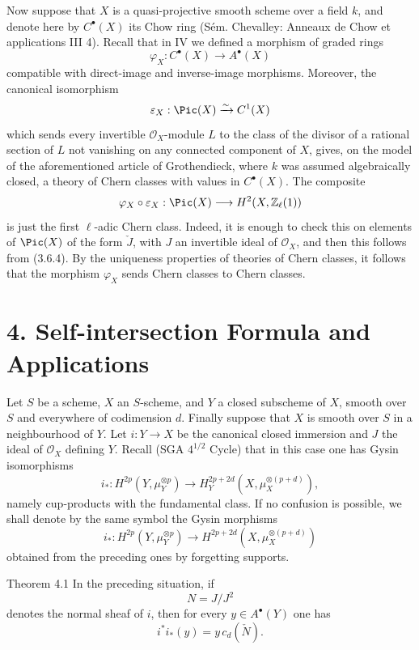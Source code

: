 Now suppose that $X$ is a quasi-projective smooth scheme over a field $k$, and denote here by $C^{\bullet}(X)$ its Chow ring (Sém. Chevalley: Anneaux de Chow et applications III 4). Recall that in IV we defined a morphism of graded rings
\[
\varphi_X:C^{\bullet}(X)\to A^{\bullet}(X)
\]
compatible with direct-image and inverse-image morphisms. Moreover, the canonical isomorphism
\[
\varepsilon_X:\Pic(X)\xrightarrow{\sim} C^1(X)
\]
which sends every invertible $\mathcal O_X$-module $L$ to the class of the divisor of a rational section of $L$ not vanishing on any connected component of $X$, gives, on the model of the aforementioned article of Grothendieck, where $k$ was assumed algebraically closed, a theory of Chern classes with values in $C^{\bullet}(X)$. The composite
\[
\varphi_X\circ\varepsilon_X:\Pic(X)\longrightarrow H^2(X,\mathbb Z_\ell(1))
\]
is just the first $\ell$-adic Chern class. Indeed, it is enough to check this on elements of $\Pic(X)$ of the form $\check J$, with $J$ an invertible ideal of $\mathcal O_X$, and then this follows from (3.6.4). By the uniqueness properties of theories of Chern classes, it follows that the morphism $\varphi_X$ sends Chern classes to Chern classes.

\section*{4. Self-intersection Formula and Applications}

Let $S$ be a scheme, $X$ an $S$-scheme, and $Y$ a closed subscheme of $X$, smooth over $S$ and everywhere of codimension $d$. Finally suppose that $X$ is smooth over $S$ in a neighbourhood of $Y$. Let $i:Y\to X$ be the canonical closed immersion and $J$ the ideal of $\mathcal O_X$ defining $Y$. Recall (SGA $4^{1/2}$ Cycle) that in this case one has Gysin isomorphisms
\[
i_*:H^{2p}(Y,\mu_Y^{\otimes p})
\to H_Y^{2p+2d}(X,\mu_X^{\otimes(p+d)}),
\]
namely cup-products with the fundamental class. If no confusion is possible, we shall denote by the same symbol the Gysin morphisms
\[
i_*:H^{2p}(Y,\mu_Y^{\otimes p})
\to H^{2p+2d}(X,\mu_X^{\otimes(p+d)})
\]
obtained from the preceding ones by forgetting supports.

\begin{statement}{Theorem 4.1}
In the preceding situation, if
\[
N=J/J^2
\]
denotes the normal sheaf of $i$, then for every $y\in A^{\bullet}(Y)$ one has
\[
i^*i_*(y)=y\,c_d(\check N).
\]
\end{statement}

